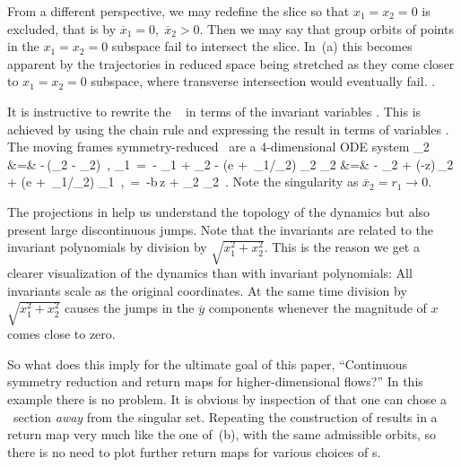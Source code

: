 \documentclass[preprint,number,sort&compress]{elsarticle}
\begin{document}
From a different perspective, we may redefine the slice so
that $x_1=x_2=0$ is excluded, that is by
$\overline{x}_1=0,\;\overline{x}_2>0$. Then we may say that
group orbits of points in the $x_1=x_2=0$ subspace fail to
intersect the slice. In \,(a) this becomes
apparent by the trajectories in reduced space being stretched
as they come closer to $x_1=x_2=0$ subspace, where transverse
intersection would eventually fail.
    .

It is instructive to rewrite the \cLe~ in terms
of the invariant variables . This is
achieved by using the chain rule  and
expressing the result in terms of variables
. The moving frames symmetry-reduced \cLe\
are a 4-dimensional ODE system
\bea
	_2 &=& -\sigma \,(_2 - _2)
\,,\quad
	_1 \,=\, - _1 + \ImrCLor {}_2
  - \left(e + {\sigma\,_1}/{\overline{x}_2}\right) \overline{y}_2
\continue
	_2 &=&  - _2 + (\RerCLor-z)\,_2
   + \left(e + {\sigma\,_1}/{\overline{x}_2}\right) \overline{y}_1
\,,\quad
	\; \,=\, -b\,z + _2 _2
\,.
\label{eq:rdcdCLeR}
\eea
Note the singularity as $\overline{x}_2=r_1\rightarrow 0$.

The projections in  help us understand the
topology of the dynamics but also present large discontinuous jumps.
Note that the in\-vari\-ants \refeq{eq:invLaser} are related to
the in\-vari\-ant polynomials  by division by
$\sqrt{x_1^2+x_2^2}$. This is the reason we get a clearer
visualization of the dynamics than with in\-vari\-ant
polynomials: All in\-vari\-ants scale as the original
coordinates. At the same time division by
$\sqrt{x_1^2+x_2^2}$ causes the jumps in the $\overline{y}$
components whenever the magnitude of $x$ comes close to zero.


So what does this imply for the ultimate goal of this paper,
``Continuous symmetry reduction and return maps for
higher-dimensional flows?'' In this example there is no
problem. It is obvious by inspection of 
that one can chose a \Poincare\ section \emph{away} from the
singular set. Repeating the construction of
 results in a return map very much like
the one of \,(b), with the same admissible
orbits, so there is no need to plot further return maps for
various choices of \slice s.
\end{document}
